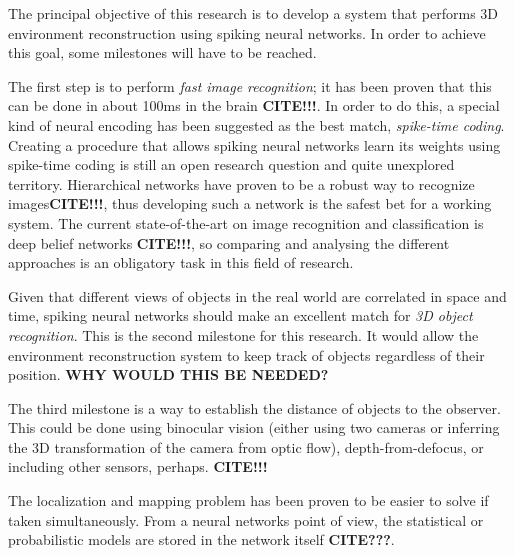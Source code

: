 The principal objective of this research is to develop a system that performs 3D environment reconstruction using spiking neural networks. In order to achieve this goal, some milestones will have to be reached. 

The first step is to perform \emph{fast image recognition}; it has been proven that this can be done in about 100ms in the brain \textbf{CITE!!!}. In order to do this, a special kind of neural encoding has been suggested as the best match, \emph{spike-time coding}. Creating a procedure that allows spiking neural networks learn its weights using spike-time coding is still an open research question and quite unexplored territory. Hierarchical networks have proven to be a robust way to recognize images\textbf{CITE!!!}, thus developing such a network is the safest bet for a working system. The current state-of-the-art on image recognition and classification is deep belief networks \textbf{CITE!!!}, so comparing and analysing the different approaches is an obligatory task in this field of research. 

Given that different views of objects in the real world are correlated in space and time, spiking neural networks should make an excellent match for \emph{3D object recognition}. This is the second milestone for this research. It would allow the environment reconstruction system to keep track of objects regardless of their position. \textbf{WHY WOULD THIS BE NEEDED?}

The third milestone is a way to establish the distance of objects to the observer. This could be done using binocular vision (either using two cameras or inferring the 3D transformation of the camera from optic flow), depth-from-defocus, or including other sensors, perhaps. \textbf{CITE!!!}

The localization and mapping problem has been proven to be easier to solve if taken simultaneously. From a neural networks point of view, the statistical or probabilistic models are stored in the network itself \textbf{CITE???}.

